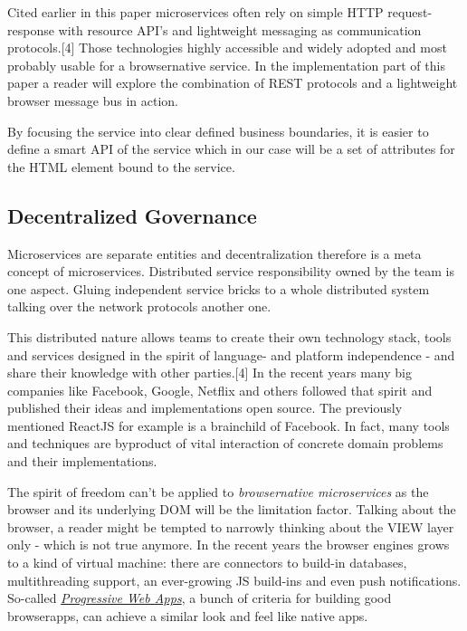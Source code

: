 \documentclass[]{assets/latex/ieee}
\begin{document}
Cited earlier in this paper microservices often rely on simple HTTP
request-response with resource API's and lightweight messaging as
communication protocols.{[}4{]} Those technologies highly accessible and
widely adopted and most probably usable for a browsernative service. In
the implementation part of this paper a reader will explore the
combination of REST protocols and a lightweight browser message bus in
action.

By focusing the service into clear defined business boundaries, it is
easier to define a smart API of the service which in our case will be a
set of attributes for the HTML element bound to the service.

\subsection{Decentralized Governance}\label{decentralized-governance}

Microservices are separate entities and decentralization therefore is a
meta concept of microservices. Distributed service responsibility owned
by the team is one aspect. Gluing independent service bricks to a whole
distributed system talking over the network protocols another one.

This distributed nature allows teams to create their own technology
stack, tools and services designed in the spirit of language- and
platform independence - and share their knowledge with other
parties.{[}4{]} In the recent years many big companies like Facebook,
Google, Netflix and others followed that spirit and published their
ideas and implementations open source. The previously mentioned ReactJS
for example is a brainchild of Facebook. In fact, many tools and
techniques are byproduct of vital interaction of concrete domain
problems and their implementations.

The spirit of freedom can't be applied to \emph{browsernative
microservices} as the browser and its underlying DOM will be the
limitation factor. Talking about the browser, a reader might be tempted
to narrowly thinking about the VIEW layer only - which is not true
anymore. In the recent years the browser engines grows to a kind of
virtual machine: there are connectors to build-in databases,
multithreading support, an ever-growing JS build-ins and even push
notifications. So-called
\emph{\href{https://developers.google.com/web/progressive-web-apps/}{Progressive
Web Apps}}, a bunch of criteria for building good browserapps, can
achieve a similar look and feel like native apps.
\end{document}
